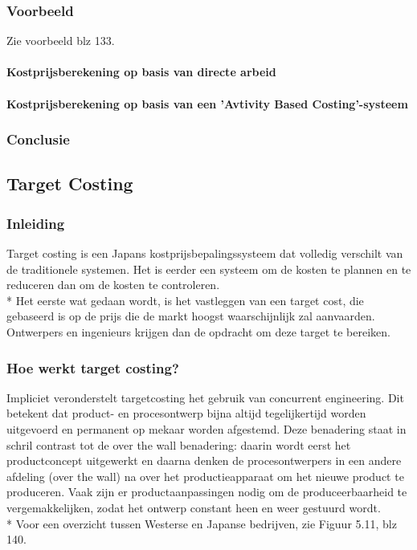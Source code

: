 \documentclass[12pt]{article}
\begin{document}
\subsubsection{Voorbeeld}
Zie voorbeeld blz 133.
\paragraph{Kostprijsberekening op basis van directe arbeid}
\paragraph{Kostprijsberekening op basis van een 'Avtivity Based Costing'-systeem}
\subsubsection{Conclusie}
\subsection{Target Costing}
\subsubsection{Inleiding}
Target costing is een Japans kostprijsbepalingssysteem dat volledig verschilt van de traditionele systemen. Het is eerder een systeem om de kosten te plannen en te reduceren dan om de kosten te controleren.\\*
Het eerste wat gedaan wordt, is het vastleggen van een target cost, die gebaseerd is op de prijs die de markt hoogst waarschijnlijk zal aanvaarden. Ontwerpers en ingenieurs krijgen dan de opdracht om deze target te bereiken.
\subsubsection{Hoe werkt target costing?}
Impliciet veronderstelt targetcosting het gebruik van concurrent engineering. Dit betekent dat product- en procesontwerp bijna altijd tegelijkertijd worden uitgevoerd en permanent op mekaar worden afgestemd. Deze benadering staat in schril contrast tot de over the wall benadering: daarin wordt eerst het productconcept uitgewerkt en daarna denken de procesontwerpers in een andere afdeling (over the wall) na over het productieapparaat om het nieuwe product te produceren. Vaak zijn er productaanpassingen nodig om de produceerbaarheid te vergemakkelijken, zodat het ontwerp constant heen en weer gestuurd wordt.\\*
Voor een overzicht tussen Westerse en Japanse bedrijven, zie Figuur 5.11, blz 140.
\end{document}
